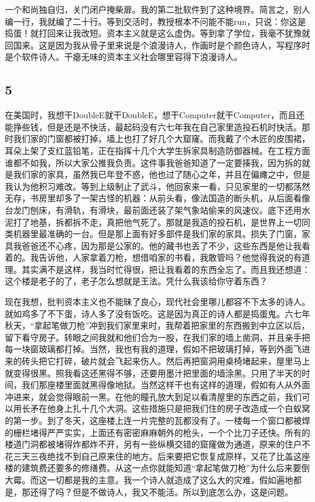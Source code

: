 一个和尚独自归，关门闭户掩柴扉。我的第二批软件到了这种境界。简言之，别人编一行，我就编了二十行。等到交活时，教授根本不问能不能run，只说：你这是捣蛋！就打回来让我改短。资本主义就是这么虚伪。等到拿了学位，我毫不犹豫就回国来。这是因为我从骨子里来说是个浪漫诗人，作画时是个颜色诗人，写程序时是个软件诗人。干瘪无味的资本主义社会哪里容得下浪漫诗人。 

\subsection{5} 

在美国时，我想干DoubleE就干DoubleE，想干Computer就干Computer，而且还能挣些钱，但是还是不快活，最起码没有六七年我在自己家里造投石机时快活。那时我们家的门窗都被打掉，墙上也打了好几个大窟窿。而我戴了个木匠的皮围裙，耳朵上架了支红蓝铅笔，正在指挥十几个大学生拆家具制造防御器械。在工程方面谁都不如我，所以大家公推我负责。这件事我爸爸知道了一定要揍我，因为拆的就是我们家的家具，虽然我已年登不惑，他也过了随心之年，并且在偏瘫之中，但是我认为他积习难改。等到上级制止了武斗，他回家来一看，只见家里的一切都荡然无存，书房里却多了一架古怪的机器：从前头看，像法国造的断头机，从后面看像台龙门刨床，有滑轨，有滑块，最前面还装了架气象站偷来的风速仪。底下还用水泥打了地基，拆都拆不走，真把他气死了。那就是我造的投石机，是世界上一切同类机器里最准确的一台。但是那上面有好多部件是我们家的家具。损失了门窗，家具我爸爸还不心疼，因为那是公家的。他的藏书也丢了不少，这些东西是他让我看着的。我告诉他，人家拿着刀枪，想借咱家的书看，我敢管吗？他觉得我说的有道理。其实满不是这样，我当时忙得很，把让我看着的东西全忘了。而且我还想道：这个楼是老子的了，老子怎么想就是王法。凭什么我该给你守着东西？ 

现在我想，批判资本主义也不能昧了良心，现代社会里哪儿都容不下太多的诗人。就如鸡多了不下蛋，诗人多了没有饭吃。这是因为真正的诗人都是捣蛋鬼。六七年秋天，“拿起笔做刀枪”冲到我们家里来时，我帮着把家里的东西搬到中立区以后，留下看守房子。转眼之间我就和他们合为一股，在我们家的墙上凿洞，并且亲手把每一块窗玻璃都打掉。当然，我也有我的道理，假如不把玻璃打掉，等到外面飞进来的砖头把它打碎，破片就会飞起来伤人。然后再把窗洞用桌椅堵起来，屋里马上就变得很黑。照我看这还黑得不够，还要用墨汁把里面的墙涂黑。只用了半天的时间，我们那座楼里面就黑得像地狱。当然这样干也有这样的道理，假如有人从外面冲进来，就会觉得眼前一黑。在他的瞳孔放大到足以看清屋里的东西之前，我们可以用长矛在他身上扎十几个大洞。这些措施只是把我们住的房子改造成一个白蚁窝的第一步。到了冬天，这座楼上连一片完整的瓦都没有了。一楼每一个窗口都被焊的栅栏堵得严严实实，上面还有密密麻麻朝外的枪头，一个个比刀子还快。所有的楼道门洞都被堵得炸都炸不开，另有一些纵横交错的窟窿做为通道，原来的住户不花三天三夜绝找不到自己原来住的地方。后来要把它恢复成原样，又花了比盖这座楼的建筑费还要多的修缮费。从这一点你就能知道“拿起笔做刀枪”为什么后来要倒大霉。而这一切都是我的主意。我一个诗人就造成了这么大的灾难，假如遍地都是，那还得了吗？但是不做诗人，我又不能活。所以到底怎么办，这是问题。

